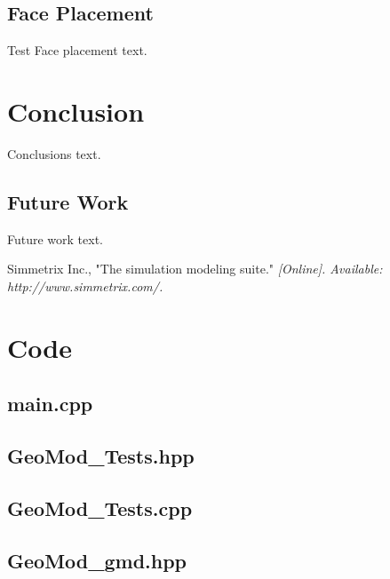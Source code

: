 \documentclass[a4paper, 12pt]{article}
\begin{document}
\subsection{Face Placement} \label{subsec:faceTest}
Test Face placement text.

\section{Conclusion} \label{sec:conclusion}
Conclusions text. 

\subsection{Future Work} \label{subsec:future}
Future work text.

\newpage
\begin{thebibliography}{99}

Simmetrix Inc., 
"The simulation modeling suite."
\textit{[Online]. Available: http://www.simmetrix.com/.}

\end{thebibliography}

\newpage
\appendix
\section{Code} \label{sec:code}

\subsection{main.cpp} \label{subsec:main_cpp}


\subsection{GeoMod\_Tests.hpp} \label{subsec:Tests_hpp}

\subsection{GeoMod\_Tests.cpp} \label{subsec:Tests_cpp}


\subsection{GeoMod\_gmd.hpp} \label{subsec:gmd_hpp}

\end{document}
